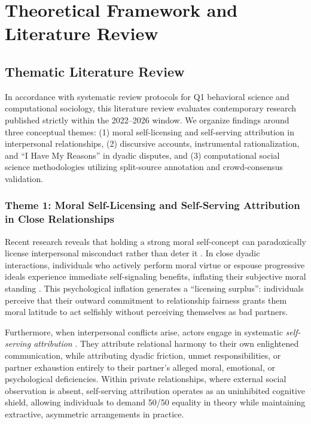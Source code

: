 \section{Theoretical Framework and Literature Review}
\label{sec:lit_review}

\subsection{Thematic Literature Review}
In accordance with systematic review protocols for Q1 behavioral science and computational sociology, this literature review evaluates contemporary research published strictly within the 2022--2026 window. We organize findings around three conceptual themes: (1) moral self-licensing and self-serving attribution in interpersonal relationships, (2) discursive accounts, instrumental rationalization, and ``I Have My Reasons'' in dyadic disputes, and (3) computational social science methodologies utilizing split-source annotation and crowd-consensus validation.

\subsubsection{Theme 1: Moral Self-Licensing and Self-Serving Attribution in Close Relationships}
Recent research reveals that holding a strong moral self-concept can paradoxically license interpersonal misconduct rather than deter it \citep{krettenauer2022when}. In close dyadic interactions, individuals who actively perform moral virtue or espouse progressive ideals experience immediate self-signaling benefits, inflating their subjective moral standing \citep{kliamenakis2023moral}. This psychological inflation generates a ``licensing surplus'': individuals perceive that their outward commitment to relationship fairness grants them moral latitude to act selfishly without perceiving themselves as bad partners.

Furthermore, when interpersonal conflicts arise, actors engage in systematic \textit{self-serving attribution} \citep{fritz2025putting}. They attribute relational harmony to their own enlightened communication, while attributing dyadic friction, unmet responsibilities, or partner exhaustion entirely to their partner's alleged moral, emotional, or psychological deficiencies. Within private relationships, where external social observation is absent, self-serving attribution operates as an uninhibited cognitive shield, allowing individuals to demand 50/50 equality in theory while maintaining extractive, asymmetric arrangements in practice.

